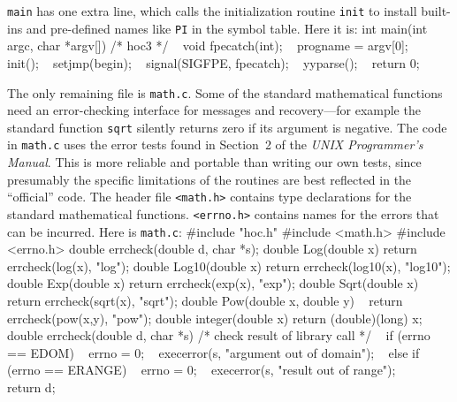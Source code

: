 {{\tt main} has one extra line, which calls the initialization
routine {\tt init} to install built-ins and pre-defined names
like {\tt PI} in the symbol table. Here it is:
\begincode
int main(int argc, char *argv[])  /* hoc3 */
{
~       void fpecatch(int);
\smallskip
~       progname = argv[0];
~       init();
~       setjmp(begin);
~       signal(SIGFPE, fpecatch);
~       yyparse();
~       return 0;
}
\endcode

The only remaining file is {\tt math.c}. Some of the standard
mathematical functions need an error-checking interface for
messages and recovery---for example the standard function
{\tt sqrt} silently returns zero if its argument is negative.
The code in {\tt math.c} uses the error tests found in Section~2
of the {\sl UNIX Programmer's Manual}. This is more reliable
and portable than writing our own tests, since presumably the
specific limitations of the routines are best reflected in the
``official'' code. The header file {\tt<math.h>} contains type
declarations for the standard mathematical functions.
{\tt<errno.h>} contains names for the errors that can be incurred.
Here is {\tt math.c}:
\begincode
#include "hoc.h"
#include <math.h>
#include <errno.h>
\smallskip
double errcheck(double d, char *s);
\smallbreak
double Log(double x)   { return errcheck(log(x),   "log");   }
double Log10(double x) { return errcheck(log10(x), "log10"); }
double Exp(double x)   { return errcheck(exp(x),   "exp");   }
double Sqrt(double x)  { return errcheck(sqrt(x),  "sqrt");  }
double Pow(double x, double y) {
~                        return errcheck(pow(x,y), "pow");   }
\smallbreak
double integer(double x) { return (double)(long) x; }
\smallbreak
double errcheck(double d, char *s)
{ /* check result of library call */
~       if (errno == EDOM) {
~               errno = 0;
~               execerror(s, "argument out of domain");
~       } else if (errno == ERANGE) {
~               errno = 0;
~               execerror(s, "result out of range");
~       }
~       return d;
}
\endcode

}

